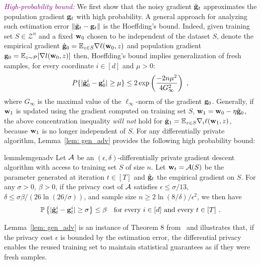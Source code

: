 \documentclass[11pt]{article}
\begin{document}

\textcolor{purple}{\textit{High-probability bound:}}
We first show that the noisy gradient $\tilde {\mathbf{g}}_t$ approximates the population gradient $\mathbf{g}_t$ with high probability.
A general approach for analyzing such estimation error $\| \tilde {\mathbf{g}}_t - \mathbf{g}_t\|$ is the Hoeffding's bound. 
Indeed, given training set $S \in \mathcal{Z}^n$ and a fixed $\mathbf{w}_0$ chosen to be independent of the dataset $S$, denote the empirical gradient $\hat {\mathbf{g}}_0= \mathbb{E}_{z \in S}\nabla \ell(\mathbf{w}_0,z)$ and population gradient $\mathbf{g}_0 = \mathbb{E}_{z\sim \mathcal{P}}[\nabla l(\mathbf{w}_0,z)]$ then, Hoeffding's bound implies generalization of fresh samples, \ie for every coordinate $i \in [d]$ and $\mu > 0$:
\begin{equation} \label{hoeffding}
P\{|\hat {\mathbf{g}}^i_0 - \mathbf{g}_0^i | \geq \mu \} \leq2 \exp \left(\frac{-2n\mu^2}{4G_\infty^2} \right)~,
\end{equation}
 where $G_\infty$ is the maximal value of the $\ell_\infty$-norm of the gradient $ \mathbf{g}_0$. 
Generally, if $\mathbf{w}_1$ is updated using the gradient computed on training set $S$, \ie $\mathbf{w}_1 = \mathbf{w}_0 - \eta \hat {\mathbf{g}}_0$, the above concentration inequality \emph{will not} hold for $\hat {\mathbf{g}}_1 = \mathbb{E}_{z \in S}\nabla_i \ell(\mathbf{w}_1,z)$, because $\mathbf{w}_1$ is no longer independent of $S$. 
For any differentially private algorithm, Lemma~\ref{lem: gen_adv} provides the following high probability bound:  
\begin{restatable}{lemm}{lemgenadv}
\label{lem: gen_adv}
	Let $\cA$ be an $(\epsilon, \delta)$-differentially private gradient descent algorithm with access to training set $S$ of size $n$. Let $\w_t = \cA(S)$ be the parameter generated at iteration $t \in [T]$ and $\hat {\mathbf{g}}_t$ the empirical gradient on $S$. For any $\sigma >0$, $\beta > 0$, if the privacy cost of $\cA$ satisfies $\epsilon \leq \sigma/13$, $\delta \leq \sigma \beta/(26 \ln(26/\sigma))$, and sample size $n \geq 2\ln(8/\delta)/\epsilon^2$, we then have
	\begin{equation*}
	\mathbb{P}\left\{ |\hat {\mathbf{g}}_t^i - \mathbf{g}_t^i| \geq  \sigma \right\} \leq \beta \quad \textrm{for every $ i\in [d]$ and every $t \in [T]$} ~.
	\end{equation*} 
\end{restatable}
Lemma~\ref{lem: gen_adv} is an instance of Theorem 8 from~\cite{dwfe15} and illustrates that, if the privacy cost $\epsilon$ is bounded by the estimation error, the differential privacy enables the reused training set to maintain statistical guarantees as if they were fresh samples. 
\end{document}
